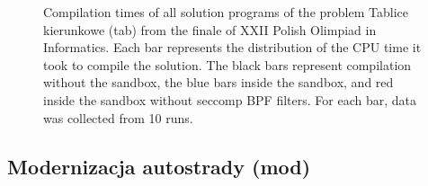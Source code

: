 \documentclass[en]{pracamgr}
\begin{document}
\begin{appendices}
\begin{figure}[H]
\caption{Compilation times of all solution programs of the problem Tablice kierunkowe (tab) from the finale of XXII Polish Olimpiad in Informatics. Each bar represents the distribution of the CPU time it took to compile the solution. The black bars represent compilation without the sandbox, the blue bars inside the sandbox, and red inside the sandbox without seccomp BPF filters. For each bar, data was collected from 10 runs.}
\label{figure:tab_compilation_cpu_time}
\end{figure}

\subsection{Modernizacja autostrady (mod)}


\end{appendices}
\end{document}
